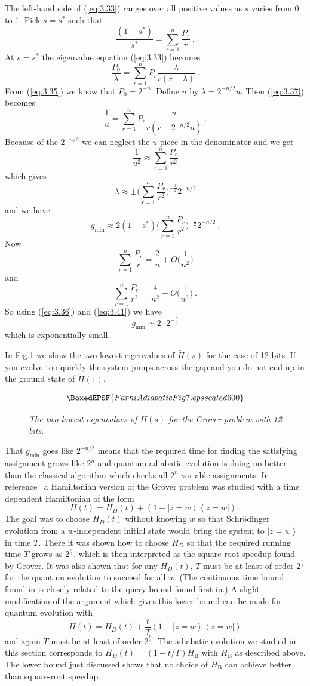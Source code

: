 \documentclass[twoside]{article}
\newcommand{\ket}[1]{\left|#1\right\rangle}
\newcommand{\bra}[1]{\left\langle#1\right|}
\newcommand{\numEq}[2]{\begin{equation}
   \label{eq:#1}
   #2\end{equation}}
\newcommand{\refEq}[1]{(\ref{eq:#1})}
\newcommand{\numFig}[3]{\begin{figure}[ht]
 $$\BoxedEPSF{#3}$$
    \caption{#2}\label{fig:#1}
   \end{figure}}
\newcommand{\refFig}[1]{Fig.\thinspace\ref{fig:#1}}
\newcommand{\citeRef}[1]{\thinspace\cite{ref:#1}}
\newcommand{\rB}{{\mathrm{B}}}
\newcommand{\gm}{g_{\min}}
\let\tilde\widetilde
\numberwithin{equation}{section}
\begin{document}
The left-hand side of \refEq{3.33} ranges over all positive values as $s$
varies from 0 to 1.  Pick $s=s^*$ such that
\numEq{3.36}{
\frac{(1-s^*)}{s^*} =\sum^n_{r=1} \frac{P_r}{r} \ . } At $s=s^*$ the
eigenvalue equation \refEq{3.33} becomes
\numEq{3.37}{
\frac{P_0}{\lambda} =\sum^n_{r=1} P_r \frac{\lambda}{r(r-\lambda)}\ . }
From \refEq{3.35} we know that $P_0 =2^{-n}$.  Define $u$ by
$\lambda=2^{-n/2}u$.  Then \refEq{3.37} becomes
\numEq{3.38}{
\frac{1}{u} =\sum^n_{r=1} P_r \frac{u}{r(r-2^{-n/2}u)}\ . } Because of the
$2^{-n/2}$ we can neglect the $u$ piece in the denominator and we get
\numEq{3.39}{
\frac{1}{u^2} \approx  \sum^n_{r=1}  \frac{P_r}{r^2} } which gives
\numEq{3.40}{
\lambda \approx \pm \Big(\sum^n_{r=1}  \frac{P_r}{r^2} \Big)^{-\frac12}
2^{-n/2} } and we have
\numEq{3.41}{
\gm \approx  2(1-s^*)  \Big( \sum^n_{r=1}  \frac{P_r}{r^2} \Big)^{-\frac12}
2^{-n/2}  \ . } Now
\numEq{3.42}{
\sum^n_{r=1} \frac{P_r}{r} = \frac{2}{n} + O \Big( \frac{1}{n^2} \Big) } and
\numEq{3.42add}{
\sum^n_{r=1} \frac{P_r}{r^2} = \frac{4}{n^2} + O \Big( \frac{1}{n^3} \Big)\ . }
So using \refEq{3.36} and \refEq{3.41} we have 
\numEq{3.42add2}{
\gm \simeq 2 \cdot 2^{-\frac{n}{2}} } which is exponentially small.

In \refFig7 we show the two lowest eigenvalues of $\tilde H(s)$ for the
case of 12 bits.  If you evolve too quickly the system jumps across the gap
and you do not end up in the ground state of $\tilde H(1)$.

\numFig{7}{\slshape  The two lowest eigenvalues of $\tilde H(s)$ for the
Grover problem with 12 bits.}{FarhiAdiabaticFig7.eps scaled 600}

That $\gm$ goes like $2^{-n/2}$ means that the required time for finding
the satisfying assignment grows like $2^n$ and quantum adiabatic
evolution is doing no better than the classical algorithm which checks all
$2^n$ variable assignments.  In reference~\citeRef2 a Hamiltonian version
of the Grover problem was studied with a time dependent Hamiltonian of
the form
\numEq{3.43}{ H(t) = H_D (t) + (1-\ket{z=w} \bra{z=w}) \ . } The goal was
to choose $H_D(t)$ without knowing $w$ so that Schr\"odinger evolution
from a $w$-independent initial state would bring the system to
$\ket{z=w}$ in time $T$.  There it was shown how to choose $H_D$ so that
the required running time $T$ grows as $2^{\frac n2}$, which is then
interpreted as the square-root speedup found by Grover.  It was also
shown that for any $H_D(t)$, $T$ must be at least of order
$2^{\frac n2}$ for  the quantum evolution to succeed for all $w$.  (The
continuous time bound found in\citeRef2 is closely related to the query
bound found first in\citeRef3.)
 A slight modification of the argument which gives this lower bound can be
made for quantum evolution with
\numEq{3.44}{ H(t) =H_D(t)  + \frac{t}{T} (1-\ket{z=w} \bra{z=w})  } and
again $T$ must be at least of order $2^{\frac{n}{2}}$.  The adiabatic
evolution we studied in this section corresponds to $H_D(t)=(1-t/T)H_\rB$
with $H_\rB$ as described above.  The lower bound just discussed shows
that no choice of $H_\rB$ can achieve better than square-root speedup.
\end{document}
